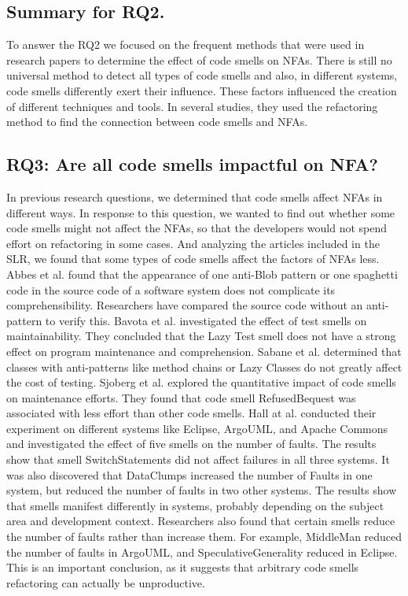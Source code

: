 \documentclass{sigchi}
\begin{document}
\subsection{Summary for RQ2.}
To answer the RQ2 we focused on the frequent methods that were used in research papers to determine the effect of code smells on NFAs. There is still no universal method to detect all types of code smells and also, in different systems, code smells differently exert their influence. These factors influenced the creation of different techniques and tools. In several studies, they used the refactoring method to find the connection between code smells and NFAs.   

\subsection{RQ3: Are all code smells impactful on NFA? }
In previous research questions, we determined that code smells affect NFAs in different ways. In response to this question, we wanted to find out whether some code smells might not affect the NFAs, so that the developers would not spend effort on refactoring in some cases. And analyzing the articles included in the SLR, we found that some types of code smells affect the factors of NFAs less. Abbes et al. \cite{Abbes} found that the appearance of one anti-Blob pattern or one spaghetti code in the source code of a software system does not complicate its comprehensibility. Researchers have compared the source code without an anti-pattern to verify this. Bavota et al. \cite{Bavota} investigated the effect of test smells on maintainability. They concluded that the Lazy Test smell does not have a strong effect on program maintenance and comprehension. Sabane et al. \cite{Sabane} determined that classes with anti-patterns like method chains or Lazy Classes do not greatly affect the cost of testing. Sjoberg et al. \cite{Sjoberg} explored the quantitative impact of code smells on maintenance efforts. They found that code smell RefusedBequest was associated with less effort than other code smells.  Hall at al. \cite{Hall} conducted their experiment on different systems like Eclipse, ArgoUML, and Apache Commons and investigated the effect of five smells on the number of faults. The results show that smell SwitchStatements did not affect failures in all three systems. It was also discovered that DataClumps increased the number of Faults in one system, but reduced the number of faults in two other systems. The results show that smells manifest differently in systems, probably depending on the subject area and development context. Researchers also found that certain smells reduce the number of faults rather than increase them. For example, MiddleMan reduced the number of faults in ArgoUML, and SpeculativeGenerality reduced in Eclipse. This is an important conclusion, as it suggests that arbitrary code smells refactoring can actually be unproductive. 
\end{document}
